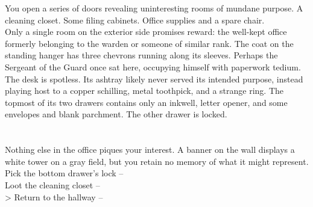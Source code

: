 You open a series of doors revealing uninteresting rooms of mundane purpose. A cleaning closet. Some filing cabinets. Office supplies and a spare chair.\\

Only a single room on the exterior side promises reward: the well-kept office formerly belonging to the warden or someone of similar rank. The coat on the standing hanger has three chevrons running along its sleeves. Perhaps the Sergeant of the Guard once sat here, occupying himself with paperwork tedium.\\

The desk is spotless. Its ashtray likely never served its intended purpose, instead playing host to a copper schilling, metal toothpick, and a strange ring. The topmost of its two drawers contains only an inkwell, letter opener, and some envelopes and blank parchment. The other drawer is locked.\\
\\
\\

Nothing else in the office piques your interest. A banner on the wall displays a white tower on a gray field, but you retain no memory of what it might represent.\\

 Pick the bottom drawer's lock -- \\
 Loot the cleaning closet -- \\
> Return to the hallway -- 